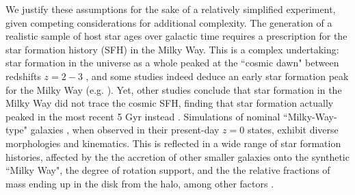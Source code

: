 \documentclass[twocolumn]{aastex631}
\begin{document}
We justify these assumptions for the sake of a relatively simplified experiment, given competing considerations for additional complexity. The generation of a realistic sample of host star ages over galactic time requires a prescription for the star formation history (SFH) in the Milky Way. This is a complex undertaking: star formation in the universe as a whole peaked at the ``cosmic dawn" between redshifts $z=2-3$ \citep{madau_cosmic_2014, lilly_canada-france_1996, madau_star_1998, hopkins_normalization_2006}, and some studies indeed deduce an early star formation peak for the Milky Way (e.g. \citealt{nidever_tracing_2014, revaz_computational_2016}). Yet, other studies conclude that star formation in the Milky Way did not trace the cosmic SFH, finding that star formation actually peaked in the most recent 5 Gyr instead \citep{snaith_reconstructing_2015}.  Simulations of nominal ``Milky-Way-type" galaxies \citep{yin_milky_2009, revaz_computational_2016, garrison-kimmel_origin_2018, hopkins_fire-2_2018}, when observed in their present-day $z=0$ states, exhibit diverse morphologies and kinematics. This is reflected in a wide range of star formation histories, affected by the the accretion of other smaller galaxies onto the synthetic ``Milky Way", the degree of rotation support, and the the relative fractions of mass ending up in the disk from the halo, among other factors \citep{garrison-kimmel_origin_2018}. 
\end{document}
